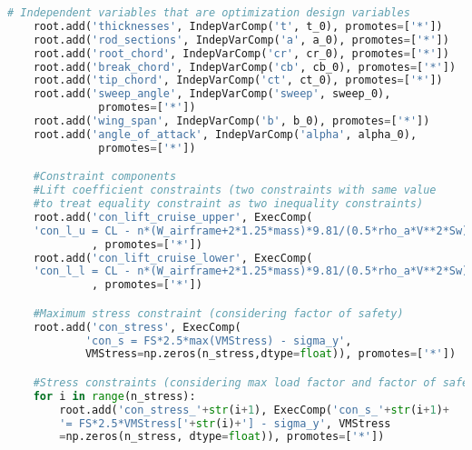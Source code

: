 \begin{lstlisting}[language=Python]
    # Independent variables that are optimization design variables
    root.add('thicknesses', IndepVarComp('t', t_0), promotes=['*'])
    root.add('rod_sections', IndepVarComp('a', a_0), promotes=['*'])
    root.add('root_chord', IndepVarComp('cr', cr_0), promotes=['*'])
    root.add('break_chord', IndepVarComp('cb', cb_0), promotes=['*'])
    root.add('tip_chord', IndepVarComp('ct', ct_0), promotes=['*'])
    root.add('sweep_angle', IndepVarComp('sweep', sweep_0), 
              promotes=['*'])
    root.add('wing_span', IndepVarComp('b', b_0), promotes=['*'])
    root.add('angle_of_attack', IndepVarComp('alpha', alpha_0), 
              promotes=['*'])

    #Constraint components
    #Lift coefficient constraints (two constraints with same value 
    #to treat equality constraint as two inequality constraints)
    root.add('con_lift_cruise_upper', ExecComp(
    'con_l_u = CL - n*(W_airframe+2*1.25*mass)*9.81/(0.5*rho_a*V**2*Sw)')
             , promotes=['*'])
    root.add('con_lift_cruise_lower', ExecComp(
    'con_l_l = CL - n*(W_airframe+2*1.25*mass)*9.81/(0.5*rho_a*V**2*Sw)')
             , promotes=['*'])

    #Maximum stress constraint (considering factor of safety)
    root.add('con_stress', ExecComp(
            'con_s = FS*2.5*max(VMStress) - sigma_y', 
            VMStress=np.zeros(n_stress,dtype=float)), promotes=['*'])

    #Stress constraints (considering max load factor and factor of safety)
    for i in range(n_stress):
        root.add('con_stress_'+str(i+1), ExecComp('con_s_'+str(i+1)+
        '= FS*2.5*VMStress['+str(i)+'] - sigma_y', VMStress
        =np.zeros(n_stress, dtype=float)), promotes=['*'])
\end{lstlisting}

